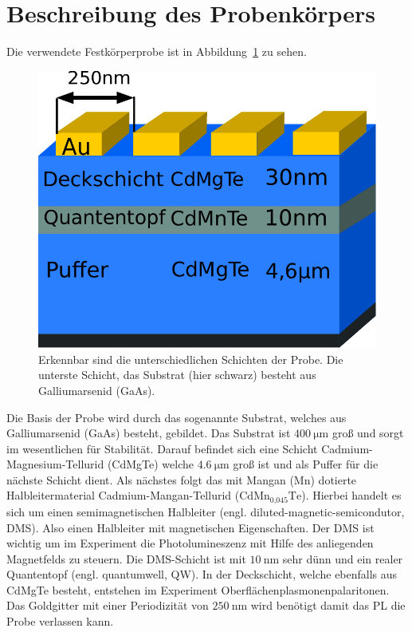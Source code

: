 \section{Beschreibung des Probenkörpers}
Die verwendete Festkörperprobe ist in Abbildung~\ref{fig:probe} zu sehen.
\begin{figure}
    \centering
    \includegraphics[scale=0.5]{./Plots/probe.pdf}
    \caption{Erkennbar sind die unterschiedlichen Schichten der Probe.
    Die unterste Schicht, das Substrat (hier schwarz) besteht aus Galliumarsenid (GaAs).}
    \label{fig:probe}
\end{figure}
\FloatBarrier

Die Basis der Probe wird durch das sogenannte Substrat, welches aus Galliumarsenid (GaAs) besteht, gebildet.
Das Substrat ist $\SI{400}{\micro\meter}$ groß und sorgt im wesentlichen für Stabilität.
Darauf befindet sich eine Schicht Cadmium-Magnesium-Tellurid (CdMgTe) welche $\SI{4,6}{\micro\meter}$ groß ist
und als Puffer für die nächste Schicht dient.
Als nächstes folgt das mit Mangan (Mn) dotierte Halbleitermaterial Cadmium-Mangan-Tellurid 
($\text{Cd}\text{Mn}_\text{0,045}\text{Te}$). 
Hierbei handelt es sich um einen semimagnetischen Halbleiter (engl. diluted-magnetic-semicondutor, DMS).\cite{allg_paper}
Also einen Halbleiter mit magnetischen Eigenschaften. 
Der DMS ist wichtig um im Experiment die Photolumineszenz mit Hilfe des anliegenden
Magnetfelds zu steuern. 
Die DMS-Schicht ist mit $\SI{10}{\nano\meter}$ sehr dünn und ein realer Quantentopf (engl. quantumwell, QW).
In der Deckschicht, welche ebenfalls aus CdMgTe besteht, entstehen im Experiment Oberflächenplasmonenpalaritonen.
Das Goldgitter mit einer Periodizität von $\SI{250}{\nano\meter}$ wird benötigt damit das PL die Probe verlassen kann.
